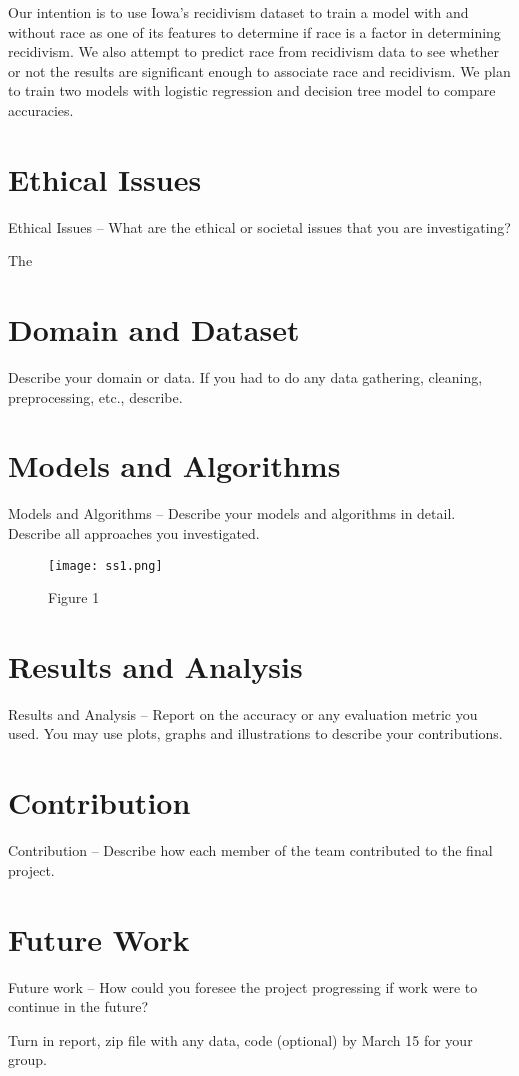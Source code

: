 \documentclass[10.5pt, twocolumn]{acmart}
\begin{document}
Our intention is to use Iowa’s recidivism dataset to train a model with and without race as one of its features to determine if race is a factor in determining recidivism. We also attempt to predict race from recidivism data to see whether or not the results are significant enough to associate race and recidivism. We  plan to train two models with logistic regression and decision tree model to compare accuracies.  


\section{Ethical Issues}
Ethical Issues – What are the ethical or societal issues that you are investigating?

The 

\section{Domain and Dataset}
Describe your domain or data. If you had to do any data gathering, cleaning,
preprocessing,
etc., describe.
\section{Models and Algorithms}
Models and Algorithms – Describe your models and algorithms in detail. Describe all
approaches you investigated.
\begin{figure}[h] 	
\centering
\texttt{[image: ss1.png]}
\caption{Figure 1}
\end{figure}


\section{Results and Analysis}
Results and Analysis – Report on the accuracy or any evaluation metric you used. You may use
plots, graphs and
illustrations to describe your contributions.

\section{Contribution}
Contribution – Describe how each member of the team contributed to the final project.


\section{Future Work}
Future work – How could you foresee the project progressing if work were to continue in the
future?


Turn in report, zip file with any data, code (optional) by March 15 for your group.
\end{document}
